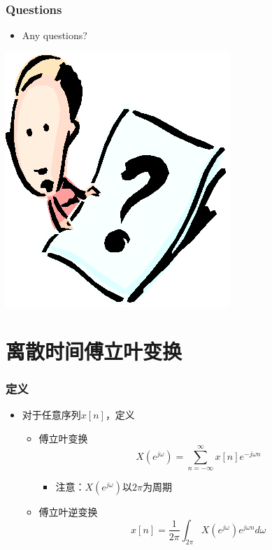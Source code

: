 \documentclass[CJKutf8,dvipsnames,table]{beamer}
\begin{document}
\begin{CJK*}{UTF8}{song}
  \begin{frame}
    \frametitle{Questions}
    \begin{itemize}
    \item Any questions?
    \end{itemize}
    \begin{center}
      \includegraphics[scale=.5]{question}
    \end{center}
  \end{frame}  
  
  \section{离散时间傅立叶变换}

  \begin{frame}
    \frametitle{定义}
    \begin{itemize}
    \item 对于任意序列$x[n]$，定义
    \begin{itemize}
    	\item 傅立叶变换
    	\[
			X(e^{j\omega}) = \sum_{n=-\infty}^{\infty}x[n]e^{-j\omega n}    
    	\]
			\begin{itemize}
			\item 注意：$X(e^{j\omega})$以$2\pi$为周期
			\end{itemize}	
    	\item 傅立叶逆变换
    	\[
			x[n] = \frac{1}{2\pi}\int_{2\pi}X(e^{j\omega})e^{j\omega n}d\omega    
    	\]
    	\end{itemize}
    \end{itemize}


\end{frame}
\end{CJK*}
\end{document}
